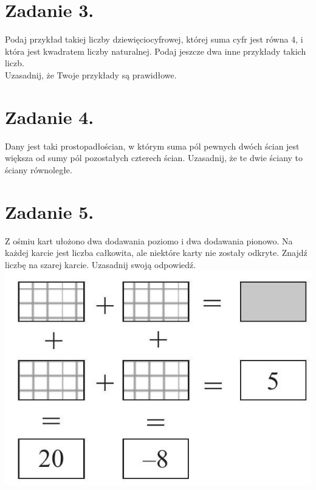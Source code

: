 \documentclass[10pt]{article}
\begin{document}
\section*{Zadanie 3.}
Podaj przykład takiej liczby dziewięciocyfrowej, której suma cyfr jest równa 4, i która jest kwadratem liczby naturalnej. Podaj jeszcze dwa inne przykłady takich liczb.\\
Uzasadnij, że Twoje przykłady są prawidłowe.

\section*{Zadanie 4.}
Dany jest taki prostopadłościan, w którym suma pól pewnych dwóch ścian jest większa od sumy pól pozostałych czterech ścian. Uzasadnij, że te dwie ściany to ściany równoległe.

\section*{Zadanie 5.}
Z ośmiu kart ułożono dwa dodawania poziomo i dwa dodawania pionowo. Na każdej karcie jest liczba całkowita, ale niektóre karty nie zostały odkryte. Znajdź liczbę na szarej karcie. Uzasadnij swoją odpowiedź.\\
\includegraphics[max width=\textwidth, center]{2024_11_21_f8e9b6ddbb018da21a54g-1}
\end{document}

